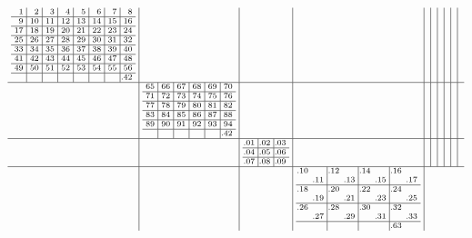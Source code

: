 \documentclass[12pt,a4paper,landscape]{amsart}
\begin{document}
\begin{align*}\scriptsize\arraycolsep3pt
  \begin{array}{c|c|c|c|c|c|c|c|c|c}
\begin{array}{r|r|r|r|r|r|r|r}%
1&2&3&4&5&6&7&8\\\hline%
9&10&11&12&13&14&15&16\\\hline%
17&18&19&20&21&22&23&24\\\hline%
25&26&27&28&29&30&31&32\\\hline%
33&34&35&36&37&38&39&40\\\hline%
41&42&43&44&45&46&47&48\\\hline%
49&50&51&52&53&54&55&56\\\hline%
  &  &  &  &  &  &  &\llap.42 \\%
\end{array}%
&&&&&&&&&\\\hline
&
\begin{array}{r|r|r|r|r|r}%
65&66&67&68&69&70\\\hline%
71&72&73&74&75&76\\\hline%
77&78&79&80&81&82\\\hline%
83&84&85&86&87&88\\\hline%
89&90&91&92&93&94\\\hline%
  &  &  &  &  &\llap.42 \\%
\end{array}%
&&&&&&&&\\\hline
&&
\begin{array}{r|r|r}%
\llap.01&\llap.02&\llap.03\\\hline%
\llap.04&\llap.05&\llap.06\\\hline%
\llap.07&\llap.08&\llap.09\\%
\end{array}%
&&&&&&&\\\hline
&&&
\begin{array}{rr|rr|rr|rr}%
\llap.10&  &\llap.12&  &\llap.14&  &\llap.16&  \\%
  &\llap.11&  &\llap.13&  &\llap.15&  &\llap.17\\\hline%
\llap.18&  &\llap.20&  &\llap.22&  &\llap.24&  \\%
  &\llap.19&  &\llap.21&  &\llap.23&  &\llap.25\\\hline%
\llap.26&  &\llap.28&  &\llap.30&  &\llap.32&  \\%
  &\llap.27&  &\llap.29&  &\llap.31&  &\llap.33\\\hline%
  &  &  &  &  &  &\llap.63&  \\%

\end{array}
\end{array}
\end{align*}
\end{document}
